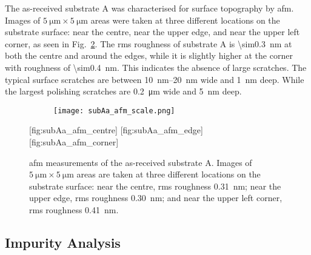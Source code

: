 The as-received substrate A was characterised for surface topography by \ac{afm}. Images of $\SI{5}{\micro\metre}\times\SI{5}{\micro\metre}$ areas were taken at three different locations on the substrate surface: near the centre, near the upper edge, and near the upper left corner, as seen in Fig.~\ref{fig:subAa_afm}. The \ac{rms} roughness of substrate A is \SI{\sim0.3}{\nano\metre} at both the centre and around the edges, while it is slightly higher at the corner with  roughness of \SI{\sim0.4}{\nano\metre}. This indicates the absence of large scratches. The typical surface scratches are between \SIrange{10}{20}{\nano\metre} wide and \SI{1}{\nano\metre} deep. While the largest polishing scratches are \SI{0.2}{\micro\metre} wide and \SI{5}{\nano\metre} deep.

\begin{figure}[htbp]
    \centering
    \begin{subfigure}[b]{0.032\linewidth}
        \label{fig:subAa_afm_scale}\captionsetup{list=no}
        \texttt{[image: subAa\_afm\_scale.png]}
    \end{subfigure}
    \hfill
    [fig:subAa_afm_centre]
    \hfill
    [fig:subAa_afm_edge]%
    \hfill
    [fig:subAa_afm_corner]%
    \caption[\Ac{afm} of as-received substrate A.]{\Ac{afm} measurements of the as-received substrate A. Images of $\SI{5}{\micro\metre}\times\SI{5}{\micro\metre}$ areas are taken at three different locations on the substrate surface:  near the centre, \ac{rms} roughness \SI{0.31}{\nano\metre};  near the upper edge, \ac{rms} roughness \SI{0.30}{\nano\metre}; and  near the upper left corner, \ac{rms} roughness \SI{0.41}{\nano\metre}.}\label{fig:subAa_afm}
\end{figure} %


\subsection{Impurity Analysis}

